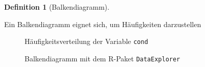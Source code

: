 \documentclass[
  a4paper,
  DIV=11]{scrreprt}
\theoremstyle{definition}
\theoremstyle{definition}
\theoremstyle{definition}
\newtheorem{definition}{Definition}[chapter]
\theoremstyle{remark}
\begin{document}
\begin{definition}[Balkendiagramm]\protect\hypertarget{def-balken}{}\label{def-balken}

Ein Balkendiagramm eignet sich, um Häufigkeiten darzustellen

\end{definition}

\begin{figure}


\caption{\label{fig-mario-n-plot-cond}Häufigkeitsverteilung der Variable
\texttt{cond}}

\end{figure}%

\begin{figure}


\caption{\label{fig-de1}Balkendiagramm mit dem R-Paket
\texttt{DataExplorer}}

\end{figure}%
\end{document}
